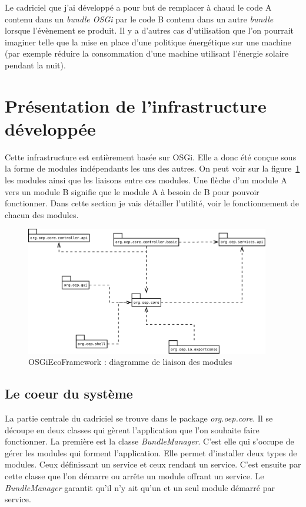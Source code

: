 \documentclass[a4paper, 11pt]{report}
\begin{document}
Le cadriciel que j'ai développé a pour but de remplacer à chaud le code A contenu dans un \textit{bundle OSGi} par le code B contenu dans un autre \textit{bundle} lorsque l'évènement se produit. Il y a d'autres cas d'utilisation que l'on pourrait imaginer telle que la mise en place d'une politique énergétique sur une machine (par exemple réduire la consommation d'une machine utilisant l'énergie solaire pendant la nuit).

	\section{Présentation de l'infrastructure développée}
Cette infrastructure est entièrement basée sur OSGi. Elle a donc été conçue sous la forme de modules indépendants les uns des autres. On peut voir sur la figure~\ref{BdlDiag} les modules ainsi que les liaisons entre ces modules. Une flèche d'un module A vers un module B signifie que le module A à besoin de B pour pouvoir fonctionner. Dans cette section je vais détailler l'utilité, voir le fonctionnement de chacun des modules.
	
\begin{figure}
	\centering
	\includegraphics[width=0.95\textwidth]{figures/EcoPattern_Bundle_Diagramme}
	\caption{OSGiEcoFramework : diagramme de liaison des modules}
	\label{BdlDiag}
\end{figure}
\subsection{Le coeur du système}
La partie centrale du cadriciel se trouve dans le package \textit{org.oep.core}. Il se découpe en deux classes qui gèrent l'application que l'on souhaite faire fonctionner. La première est la classe \textit{BundleManager}. C'est elle qui s'occupe de gérer les modules qui forment l'application. Elle permet d'installer deux types de modules. Ceux définissant un service et ceux rendant un service. C'est ensuite par cette classe que l'on démarre ou arrête un module offrant un service. Le \textit{BundleManager} garantit qu'il n'y ait qu'un et un seul module démarré par service.
\end{document}
